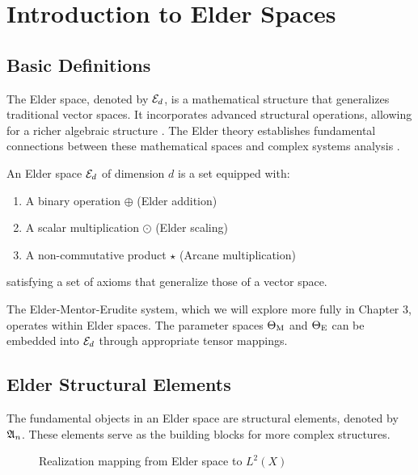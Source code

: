 \chapter{Introduction to Elder Spaces}

\section{Basic Definitions}

The Elder space, denoted by $\mathcal{E}_{d}$, is a mathematical structure that generalizes traditional vector spaces. It incorporates advanced structural operations, allowing for a richer algebraic structure \cite{elder_theory}. The Elder theory establishes fundamental connections between these mathematical spaces and complex systems analysis \cite{complex_mathematics}.

\begin{definition}
An Elder space $\mathcal{E}_{d}$ of dimension $d$ is a set equipped with:
\begin{enumerate}
    \item A binary operation $\oplus$ (Elder addition)
    \item A scalar multiplication $\odot$ (Elder scaling)
    \item A non-commutative product $\star$ (Arcane multiplication)
\end{enumerate}
satisfying a set of axioms that generalize those of a vector space.
\end{definition}

\begin{remark}
The Elder-Mentor-Erudite system, which we will explore more fully in Chapter 3, operates within Elder spaces. The parameter spaces $\Theta_{\text{M}}$ and $\Theta_{\text{E}}$ can be embedded into $\mathcal{E}_{d}$ through appropriate tensor mappings.
\end{remark}

\section{Elder Structural Elements}

The fundamental objects in an Elder space are structural elements, denoted by $\mathfrak{A}_{n}$. These elements serve as the building blocks for more complex structures.

\begin{figure}[htbp]
\centering
{}
\caption{Realization mapping from Elder space to $L^2(X)$}
\label{fig:realization-mapping}
\end{figure}

